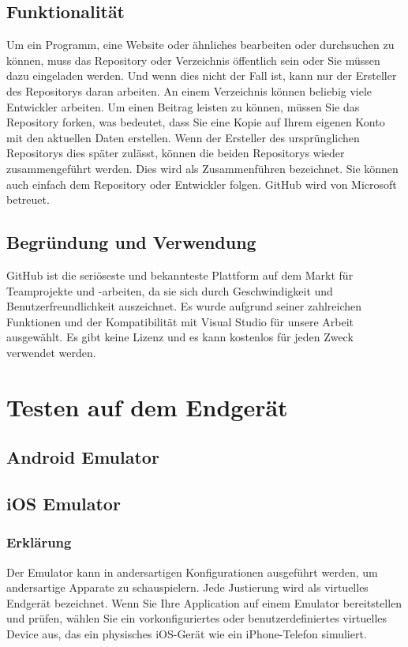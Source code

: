 \subsection*{Funktionalität}
Um ein Programm, eine Website oder ähnliches bearbeiten oder durchsuchen zu können, 
muss das Repository oder Verzeichnis öffentlich sein oder Sie müssen dazu eingeladen 
werden. Und wenn dies nicht der Fall ist, kann nur der Ersteller des Repositorys 
daran arbeiten. An einem Verzeichnis können beliebig viele Entwickler arbeiten. 
Um einen Beitrag leisten zu können, müssen Sie das Repository forken, was bedeutet, 
dass Sie eine Kopie auf Ihrem eigenen Konto mit den aktuellen Daten erstellen. 
Wenn der Ersteller des ursprünglichen Repositorys dies später zulässt, können die 
beiden Repositorys wieder zusammengeführt werden. Dies wird als Zusammenführen 
bezeichnet. Sie können auch einfach dem Repository oder Entwickler folgen. 
GitHub wird von Microsoft betreuet.
\subsection*{Begründung und Verwendung}
GitHub ist die seriöseste und bekannteste Plattform auf dem Markt für Teamprojekte 
und -arbeiten, da sie sich durch Geschwindigkeit und Benutzerfreundlichkeit 
auszeichnet. Es wurde aufgrund seiner zahlreichen Funktionen und der Kompatibilität 
mit Visual Studio für unsere Arbeit ausgewählt. Es gibt keine Lizenz und es kann 
kostenlos für jeden Zweck verwendet werden.
\newpage

\section{Testen auf dem Endgerät}
\subsection{Android Emulator}
\newpage

\subsection{iOS Emulator}
\cite{IOsEmulatorOnMac}
\cite{IOsEmulatorOnWin}
\subsubsection*{Erklärung}
Der Emulator kann in andersartigen Konfigurationen 
ausgeführt werden, um andersartige Apparate zu schauspielern. 
Jede Justierung wird als virtuelles Endgerät bezeichnet. 
Wenn Sie Ihre Application auf einem Emulator bereitstellen 
und prüfen, wählen Sie ein vorkonfiguriertes oder 
benutzerdefiniertes virtuelles Device aus, das ein 
physisches iOS-Gerät wie ein iPhone-Telefon simuliert.
